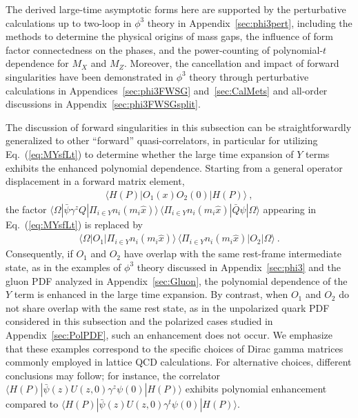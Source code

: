 \documentclass[a4paper,11pt]{article}
\begin{document}
The derived large-time asymptotic forms here are supported by the perturbative calculations up to two-loop in $\phi^3$ theory in Appendix~\ref{sec:phi3pert}, including the methods to determine the physical origins of mass gaps, the influence of form factor connectedness on the phases, and the power-counting of polynomial-$t$ dependence for $M_X$ and $M_Z$. Moreover, the cancellation and impact of forward singularities have been demonstrated in $\phi^3$ theory through perturbative calculations in Appendices~\ref{sec:phi3FWSG} and~\ref{sec:CalMets} and all-order discussions in Appendix~\ref{sec:phi3FWSGsplit}. 

The discussion of forward singularities in this subsection can be straightforwardly generalized to other “forward” quasi-correlators, in particular for utilizing Eq.~(\ref{eq:MYsfLt}) to determine whether the large time expansion of $Y$ terms exhibits the enhanced polynomial dependence. Starting from a general operator displacement in a forward matrix element,
\begin{align}\label{eq:GOdis}
    \langle H(P) | O_1(x) O_2(0) | H(P) \rangle \ ,
\end{align}
the factor $\langle \Omega | \bar{\psi} \gamma^z Q | \Pi_{i \in Y} n_i( m_i \hat{x} ) \rangle \,  \langle \Pi_{i \in Y} n_i( m_i \hat{x} ) | \bar{Q}  \psi | \Omega \rangle$ appearing in Eq.~(\ref{eq:MYsfLt}) is replaced by
\begin{align}\label{eq:replace}
    \langle \Omega | O_1 | \Pi_{i \in Y} n_i( m_i \hat{x} ) \rangle \,  \langle \Pi_{i \in Y} n_i( m_i \hat{x} ) | O_2 | \Omega \rangle \ .
\end{align}
Consequently, if $O_1$ and $O_2$ have overlap with the same rest-frame intermediate state, as in the examples of $\phi^3$ theory discussed in Appendix~\ref{sec:phi3} and the gluon PDF analyzed in Appendix~\ref{sec:Gluon}, the polynomial dependence of the $Y$ term is enhanced in the large time expansion. By contrast, when $O_1$ and $O_2$ do not share overlap with the same rest state, as in the unpolarized quark PDF considered in this subsection and the polarized cases studied in Appendix~\ref{sec:PolPDF}, such an enhancement does not occur. We emphasize that these examples correspond to the specific choices of Dirac gamma matrices commonly employed in lattice QCD calculations. For alternative choices, different conclusions may follow; for instance, the correlator $\langle H(P) | \bar{\psi}(z) U(z,0) \gamma^z \psi(0) | H(P) \rangle$ exhibits polynomial enhancement compared to $\langle H(P) | \bar{\psi}(z) U(z,0) \gamma^t \psi(0) | H(P) \rangle$.
\end{document}
